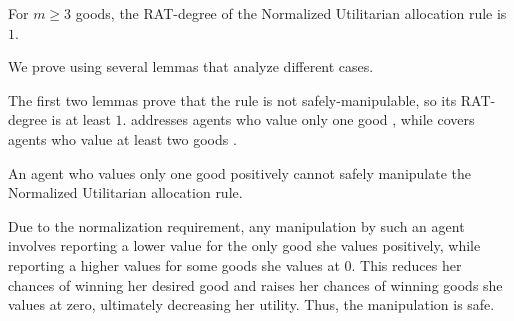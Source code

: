 \begin{theorem}
\label{thm:normalized-utilitarian-goods}
For $m \geq 3$ goods,  the RAT-degree of the Normalized Utilitarian allocation rule is $1$.
\end{theorem}

We prove  using several lemmas that analyze different cases. 

The first two lemmas prove that the rule is not 
safely-manipulable, so its RAT-degree is at least $1$.
 addresses agents who value only one good , while  covers agents who value at least two goods .



\begin{lemmarep}
\label{claim:normalized-agent-who-likes-single-good}
An agent who values only one good positively cannot safely manipulate the Normalized Utilitarian allocation rule.
\end{lemmarep}

\begin{proofsketch}
Due to the normalization requirement, 
any manipulation by such an agent involves reporting a lower value for the only good she values positively, while reporting a higher values for some goods she values at 0. This reduces her chances of winning her desired good and raises her chances of winning goods she values at zero, ultimately decreasing her utility. Thus, the manipulation is  safe.
\end{proofsketch}

